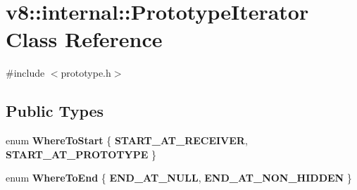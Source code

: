 \hypertarget{classv8_1_1internal_1_1_prototype_iterator}{}\section{v8\+:\+:internal\+:\+:Prototype\+Iterator Class Reference}
\label{classv8_1_1internal_1_1_prototype_iterator}


{\ttfamily \#include $<$prototype.\+h$>$}

\subsection*{Public Types}
\begin{DoxyCompactItemize}
\item 
\hypertarget{classv8_1_1internal_1_1_prototype_iterator_ac1d06cadd4ffc11f60273f23b4b03bb0}{}enum {\bfseries Where\+To\+Start} \{ {\bfseries S\+T\+A\+R\+T\+\_\+\+A\+T\+\_\+\+R\+E\+C\+E\+I\+V\+E\+R}, 
{\bfseries S\+T\+A\+R\+T\+\_\+\+A\+T\+\_\+\+P\+R\+O\+T\+O\+T\+Y\+P\+E}
 \}\label{classv8_1_1internal_1_1_prototype_iterator_ac1d06cadd4ffc11f60273f23b4b03bb0}

\item 
\hypertarget{classv8_1_1internal_1_1_prototype_iterator_a56b39f100d48581d82bcbd824e9e6b34}{}enum {\bfseries Where\+To\+End} \{ {\bfseries E\+N\+D\+\_\+\+A\+T\+\_\+\+N\+U\+L\+L}, 
{\bfseries E\+N\+D\+\_\+\+A\+T\+\_\+\+N\+O\+N\+\_\+\+H\+I\+D\+D\+E\+N}
 \}\label{classv8_1_1internal_1_1_prototype_iterator_a56b39f100d48581d82bcbd824e9e6b34}

\end{DoxyCompactItemize}
